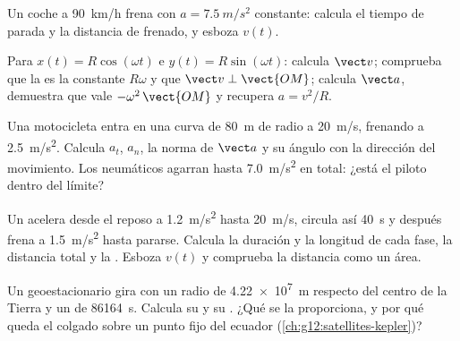 \begin{exercise}[$\star\star$]\label{exo:g12:kinematics-2d:11}
Un coche a \qty{90}{km/h} frena con $a = \qty{7.5}{m/s^2}$ constante:
calcula el tiempo de parada y la distancia de frenado, y esboza $v(t)$.
\end{exercise}

\begin{exercise}[$\star\star\star$]\label{exo:g12:kinematics-2d:12}
Para $x(t) = R\cos(\omega t)$ e $y(t) = R\sin(\omega t)$: calcula
$\vect v$; comprueba que la  es la constante $R\omega$ y que
$\vect v \perp \vect{OM}$; calcula $\vect a$, demuestra que vale
$-\omega^2\,\vect{OM}$ y recupera $a = v^2/R$.
\end{exercise}

\begin{exercise}[$\star\star\star$]\label{exo:g12:kinematics-2d:13}
Una motocicleta entra en una curva de \qty{80}{m} de radio a
\qty{20}{m/s}, frenando a \qty{2.5}{m/s^2}. Calcula $a_t$, $a_n$, la
norma de $\vect a$ y su ángulo con la dirección del movimiento. Los
neumáticos agarran hasta \qty{7.0}{m/s^2} en total: ¿está el piloto
dentro del límite?
\end{exercise}

\begin{exercise}[$\star\star\star$]\label{exo:g12:kinematics-2d:14}
Un  acelera desde el reposo a \qty{1.2}{m/s^2} hasta
\qty{20}{m/s}, circula así \qty{40}{s} y después frena a
\qty{1.5}{m/s^2} hasta pararse. Calcula la duración y la longitud de
cada fase, la distancia total y la . Esboza $v(t)$ y
comprueba la distancia como un área.
\end{exercise}

\begin{exercise}[$\star\star\star$]\label{exo:g12:kinematics-2d:15}
Un  geoestacionario gira con un radio de \qty{4.22e7}{m}
respecto del centro de la Tierra y un  de \qty{86164}{s}.
Calcula su  y su . ¿Qué se la
proporciona, y por qué queda el  colgado sobre un punto fijo del
ecuador (\cref{ch:g12:satellites-kepler})?
\end{exercise}

